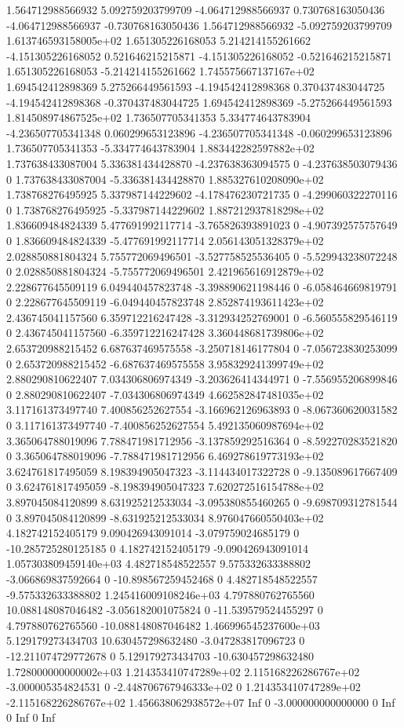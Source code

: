 {1.564712988566932	5.092759203799709	-4.064712988566937	0.730768163050436	-4.064712988566937	-0.730768163050436	1.564712988566932	-5.092759203799709	1.613746593158005e+02
1.651305226168053	5.214214155261662	-4.151305226168052	0.521646215215871	-4.151305226168052	-0.521646215215871	1.651305226168053	-5.214214155261662	1.745575667137167e+02
1.694542412898369	5.275266449561593	-4.194542412898368	0.370437483044725	-4.194542412898368	-0.370437483044725	1.694542412898369	-5.275266449561593	1.814508974867525e+02
1.736507705341353	5.334774643783904	-4.236507705341348	0.060299653123896	-4.236507705341348	-0.060299653123896	1.736507705341353	-5.334774643783904	1.883442282597882e+02
1.737638433087004	5.336381434428870	-4.237638363094575	0	-4.237638503079436	0	1.737638433087004	-5.336381434428870	1.885327610208090e+02
1.738768276495925	5.337987144229602	-4.178476230721735	0	-4.299060322270116	0	1.738768276495925	-5.337987144229602	1.887212937818298e+02
1.836609484824339	5.477691992117714	-3.765826393891023	0	-4.907392575757649	0	1.836609484824339	-5.477691992117714	2.056143051328379e+02
2.028850881804324	5.755772069496501	-3.527758525536405	0	-5.529943238072248	0	2.028850881804324	-5.755772069496501	2.421965616912879e+02
2.228677645509119	6.049440457823748	-3.398890621198446	0	-6.058464669819791	0	2.228677645509119	-6.049440457823748	2.852874193611423e+02
2.436745041157560	6.359712216247428	-3.312934252769001	0	-6.560555829546119	0	2.436745041157560	-6.359712216247428	3.360448681739806e+02
2.653720988215452	6.687637469575558	-3.250718146177804	0	-7.056723830253099	0	2.653720988215452	-6.687637469575558	3.958329241399749e+02
2.880290810622407	7.034306806974349	-3.203626414344971	0	-7.556955206899846	0	2.880290810622407	-7.034306806974349	4.662582847481035e+02
3.117161373497740	7.400856252627554	-3.166962126963893	0	-8.067360620031582	0	3.117161373497740	-7.400856252627554	5.492135060987694e+02
3.365064788019096	7.788471981712956	-3.137859292516364	0	-8.592270283521820	0	3.365064788019096	-7.788471981712956	6.469278619773193e+02
3.624761817495059	8.198394905047323	-3.114434017322728	0	-9.135089617667409	0	3.624761817495059	-8.198394905047323	7.620272516154788e+02
3.897045084120899	8.631925212533034	-3.095380855460265	0	-9.698709312781544	0	3.897045084120899	-8.631925212533034	8.976047660550403e+02
4.182742152405179	9.090426943091014	-3.079759024685179	0	-10.285725280125185	0	4.182742152405179	-9.090426943091014	1.057303809459140e+03
4.482718548522557	9.575332633388802	-3.066869837592664	0	-10.898567259452468	0	4.482718548522557	-9.575332633388802	1.245416009108246e+03
4.797880762765560	10.088148087046482	-3.056182001075824	0	-11.539579524455297	0	4.797880762765560	-10.088148087046482	1.466996545237600e+03
5.129179273434703	10.630457298632480	-3.047283817096723	0	-12.211074729772678	0	5.129179273434703	-10.630457298632480	1.728000000000002e+03
1.214353410747289e+02	2.115168226286767e+02	-3.000005354824531	0	-2.448706767946333e+02	0	1.214353410747289e+02	-2.115168226286767e+02	1.456638062938572e+07
Inf	0	-3.000000000000000	0	Inf	0	Inf	0	Inf
}\mytable

